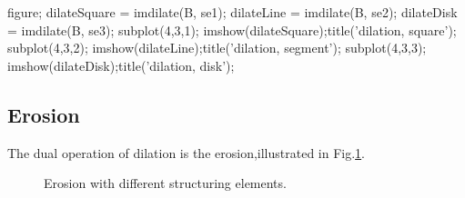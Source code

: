 \begin{matlab}
figure;
dilateSquare = imdilate(B, se1);
dilateLine = imdilate(B, se2);
dilateDisk = imdilate(B, se3);
subplot(4,3,1); imshow(dilateSquare);title('dilation, square');
subplot(4,3,2); imshow(dilateLine);title('dilation, segment');
subplot(4,3,3); imshow(dilateDisk);title('dilation, disk');
\end{matlab}

\subsection{Erosion}The dual operation of dilation is the erosion,illustrated in Fig.\ref{fig:matlab:morphology_reconstruction:erosion}.

\begin{figure}[htbp]
 \centering
 \hfill
 \hfill
 \caption{Erosion with different structuring elements.}
 \label{fig:matlab:morphology_reconstruction:erosion}
\end{figure}

